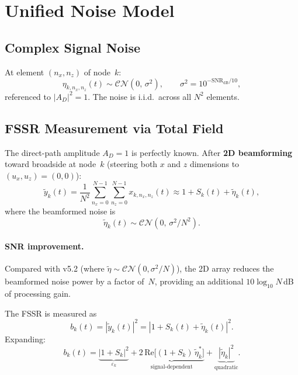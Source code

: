 \documentclass[11pt,a4paper]{article}
\begin{document}
\section{Unified Noise Model}
\label{sec:noise}

\subsection{Complex Signal Noise}
At element $(n_x,n_z)$ of node~$k$:
\begin{equation}
  \eta_{k,n_x,n_z}(t) \sim \mathcal{CN}(0,\,\sigma^2),
  \qquad
  \sigma^2 = 10^{-\mathrm{SNR}_{\mathrm{dB}}/10},
  \label{eq:noise_def}
\end{equation}
referenced to $|A_D|^2=1$.  The noise is i.i.d.\ across all $N^2$
elements.

\subsection{FSSR Measurement via Total Field}
\label{sec:fssr_measurement}

The direct-path amplitude $A_D=1$ is perfectly known.  After
\textbf{2D beamforming} toward broadside at node~$k$ (steering both
$x$ and $z$ dimensions to $(u_x,u_z)=(0,0)$):
\begin{equation}
  \tilde{y}_k(t) = \frac{1}{N^2}\sum_{n_x=0}^{N-1}
  \sum_{n_z=0}^{N-1} x_{k,n_x,n_z}(t)
  \approx 1 + S_k(t) + \tilde{\eta}_k(t),
  \label{eq:beamformed}
\end{equation}
where the beamformed noise is
\begin{equation}
  \tilde{\eta}_k(t) \sim \mathcal{CN}(0,\,\sigma^2/N^2).
  \label{eq:beamformed_noise}
\end{equation}

\paragraph{SNR improvement.}
Compared with v5.2 (where $\tilde{\eta}\sim\mathcal{CN}(0,\sigma^2/N)$),
the 2D array reduces the beamformed noise power by a factor of~$N$,
providing an additional $10\log_{10}N$\,dB of processing gain.

The FSSR is measured as
\begin{equation}
  \boxed{b_k(t) = |\tilde{y}_k(t)|^2
  = |1 + S_k(t) + \tilde{\eta}_k(t)|^2.}
  \label{eq:fssr_measured}
\end{equation}
Expanding:
\begin{equation}
  b_k(t) = \underbrace{|1{+}S_k|^2}_{\varepsilon_k}
  + \underbrace{2\,\mathrm{Re}\!\bigl[(1{+}S_k)\,
  \tilde{\eta}_k^*\bigr]}_{\text{signal-dependent}}
  + \underbrace{|\tilde{\eta}_k|^2}_{\text{quadratic}}.
  \label{eq:fssr_expanded}
\end{equation}
\end{document}
